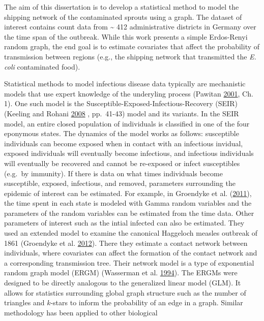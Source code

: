 \documentclass[11pt,a4paper]{article}
\begin{document}
The aim of this dissertation is to develop a statistical method to model
the shipping network of the contaminated sprouts using a graph. The
dataset of interest contains count data from \textasciitilde{} 412
administrative districts in Germany over the time span of the outbreak.
While this work presents a simple Erdos-Renyi random graph, the end goal
is to estimate covariates that affect the probability of transmission
between regions (e.g., the shipping network that transmitted the
\emph{E. coli} contaminated food).

Statistical methods to model infectious disease data typically are
mechanistic models that use expert knowledge of the underyling process
(Pawitan \protect\hyperlink{ref-pawitan_all_2001}{2001}, Ch. 1). One
such model is the Susceptible-Exposed-Infectious-Recovery (SEIR)
(Keeling and Rohani \protect\hyperlink{ref-keeling_modeling_2008}{2008}
, pp.~41-43) model and its variants. In the SEIR model, an entire closed
population of individuals is classified in one of the four eponymous
states. The dynamics of the model works as follows: susceptible
individuals can become exposed when in contact with an infectious
invidual, exposed individuals will eventually become infectious, and
infectious individuals will eventually be recovered and cannot be
re-exposed or infect susceptibles (e.g.~by immunity). If there is data
on what times individuals become susceptible, exposed, infectious, and
removed, parameters surrounding the epidemic of interest can be
estimated. For example, in Groendyke et al.
(\protect\hyperlink{ref-groendyke_bayesian_2011}{2011}), the time spent
in each state is modeled with Gamma random variables and the parameters
of the random variables can be estimated from the time data. Other
parameters of interest such as the intial infected can also be
estimated. They used an extended model to examine the canonical
Haggeloch measles outbreak of 1861 (Groendyke et al.
\protect\hyperlink{ref-groendyke_network-based_2012}{2012}). There they
estimate a contact network between individuals, where covariates can
affect the formation of the contact network and a corresponding
transmission tree. Their network model is a type of exponential random
graph model (ERGM) (Wasserman et al.
\protect\hyperlink{ref-wasserman_social_1994}{1994}). The ERGMs were
designed to be directly analogous to the generalized linear model (GLM).
It allows for statistics surrounding global graph structure such as the
number of triangles and \(k\)-stars to inform the probability of an edge
in a graph. Similar methodology has been applied to other biological
\end{document}
